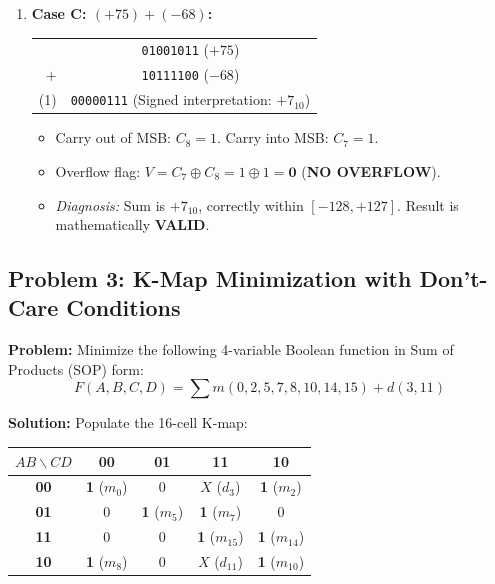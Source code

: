 \begin{enumerate}[label=\bfseries\alph*.]
    \item \textbf{Case C: $(+75) + (-68)$:}
    \begin{center}
    \begin{tabular}{r c}
      & \texttt{01001011} \quad ($+75$) \\
    $+$ & \texttt{10111100} \quad ($-68$) \\
    \hline
    (1) & \texttt{00000111} \quad (Signed interpretation: $+7_{10}$)
    \end{tabular}
    \end{center}
    \begin{itemize}
        \item Carry out of MSB: $C_8 = 1$. Carry into MSB: $C_7 = 1$.
        \item Overflow flag: $V = C_7 \oplus C_8 = 1 \oplus 1 = \mathbf{0}$ (\textbf{NO OVERFLOW}).
        \item \textit{Diagnosis:} Sum is $+7_{10}$, correctly within $[-128, +127]$. Result is mathematically \textbf{VALID}.
    \end{itemize}
\end{enumerate}

\subsection{Problem 3: K-Map Minimization with Don't-Care Conditions}
\textbf{Problem:} Minimize the following 4-variable Boolean function in Sum of Products (SOP) form:
\[ F(A, B, C, D) = \sum m(0, 2, 5, 7, 8, 10, 14, 15) + d(3, 11) \]

\textbf{Solution:}
Populate the 16-cell K-map:
\begin{center}
\small
\begin{tabular}{|c|c|c|c|c|}
\hline
$AB \backslash CD$ & \textbf{00} & \textbf{01} & \textbf{11} & \textbf{10} \\
\hline
\textbf{00} & \textbf{1} ($m_0$) & 0 & $X$ ($d_3$) & \textbf{1} ($m_2$) \\
\hline
\textbf{01} & 0 & \textbf{1} ($m_5$) & \textbf{1} ($m_7$) & 0 \\
\hline
\textbf{11} & 0 & 0 & \textbf{1} ($m_{15}$) & \textbf{1} ($m_{14}$) \\
\hline
\textbf{10} & \textbf{1} ($m_8$) & 0 & $X$ ($d_{11}$) & \textbf{1} ($m_{10}$) \\
\hline
\end{tabular}
\end{center}

